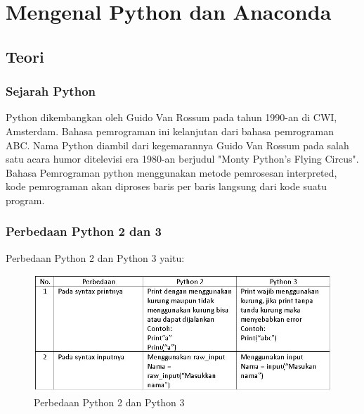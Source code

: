 \chapter{Mengenal Python dan Anaconda}

\section{Teori}
\subsection{Sejarah Python}
Python dikembangkan oleh Guido Van Rossum pada tahun 1990-an di CWI, Amsterdam. Bahasa pemrograman ini kelanjutan dari bahasa pemrograman ABC. Nama Python diambil dari kegemarannya Guido Van Rossum pada salah satu acara humor ditelevisi era 1980-an berjudul "Monty Python's Flying Circus". Bahasa Pemrograman python menggunakan metode pemrosesan interpreted, kode pemrograman akan diproses baris per baris langsung dari kode suatu program. 
\subsection{Perbedaan Python 2 dan 3}
Perbedaan Python 2 dan Python 3 yaitu:
\begin{figure}[H]
        \centerline{\includegraphics[scale=0.7]{figures/beda}}
        \caption{Perbedaan Python 2 dan Python 3}
		\label{beda}
\end{figure}

